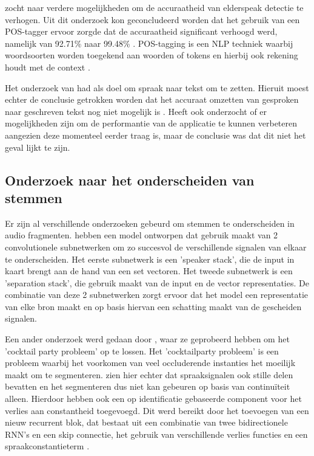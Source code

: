 \textcite{Branden2024} zocht naar verdere mogelijkheden om de accuraatheid van elderspeak detectie te verhogen. Uit dit onderzoek kon geconcludeerd worden dat het gebruik van een POS-tagger ervoor zorgde dat de accuraatheid significant verhoogd werd, namelijk van 92.71\% naar 99.48\% \autocite{Branden2024}. POS-tagging is een NLP techniek waarbij woordsoorten worden toegekend aan woorden of tokens en hierbij ook rekening houdt met de context \autocite{Branden2024}.

Het onderzoek van \textcite{Schryver2024} had als doel om spraak naar tekst om te zetten. Hieruit moest echter de conclusie getrokken worden dat het accuraat omzetten van gesproken naar geschreven tekst nog niet mogelijk is \autocite{Schryver2024}. \textcite{Schryver2024} Heeft ook onderzocht of er mogelijkheden zijn om de performantie van de applicatie te kunnen verbeteren aangezien deze momenteel eerder traag is, maar de conclusie was dat dit niet het geval lijkt te zijn.

\subsection{Onderzoek naar het onderscheiden van stemmen}

Er zijn al verschillende onderzoeken gebeurd om stemmen te onderscheiden in audio fragmenten. \textcite{Zeghidour2021} hebben een model ontworpen dat gebruik maakt van 2 convolutionele subnetwerken om zo succesvol de verschillende signalen van elkaar te onderscheiden. Het eerste subnetwerk is een 'speaker stack', die de input in kaart brengt aan de hand van een set vectoren. Het tweede subnetwerk is een 'separation stack', die gebruik maakt van de input en de vector representaties. De combinatie van deze 2 subnetwerken zorgt ervoor dat het model een representatie van elke bron maakt en op basis hiervan een schatting maakt van de gescheiden signalen. \autocite{Zeghidour2021}

Een ander onderzoek werd gedaan door \textcite{Nachmani2020}, waar ze geprobeerd hebben om het 'cocktail party probleem' op te lossen. Het 'cocktailparty probleem' is een probleem waarbij het voorkomen van veel occluderende instanties het moeilijk maakt om te segmenteren. \textcite{Nachmani2020} zien hier echter dat spraaksignalen ook stille delen bevatten en het segmenteren dus niet kan gebeuren op basis van continuïteit alleen. Hierdoor hebben \textcite{Nachmani2020} ook een op identificatie gebaseerde component voor het verlies aan constantheid toegevoegd. Dit werd bereikt door het toevoegen van een nieuw recurrent blok, dat bestaat uit een combinatie van twee bidirectionele RNN's en een skip connectie, het gebruik van verschillende verlies functies en een spraakconstantieterm \autocite{Nachmani2020}.


